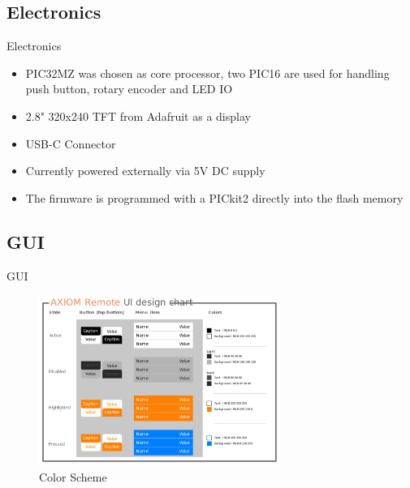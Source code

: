 \documentclass{beamer}
\begin{document}
\subsection{Electronics}

\begin{frame}{Electronics}
	\begin{itemize}
		\item PIC32MZ was chosen as core processor, two PIC16 are used for handling push button, rotary encoder and LED IO
		\item 2.8" 320x240 TFT from Adafruit as a display
		\item USB-C Connector
		\item Currently powered externally via 5V DC supply
		\item The firmware is programmed with a PICkit2 directly into the flash memory
	\end{itemize}
\end{frame}

\subsection{GUI}

\begin{frame}{GUI}
	\begin{center}
		\begin{figure}[htbp]
		    \centering
		    \includegraphics[width=0.7\textwidth,clip]{images/AXIOM_Remote_UI_design_chart.pdf}
		    \caption{Color Scheme}
		    \label{fig:logo}
		\end{figure}
	\end{center}
\end{frame}
\end{document}
